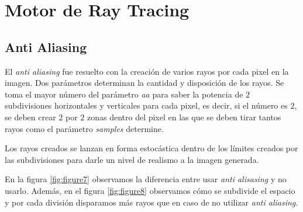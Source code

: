\documentclass[a4paper,10pt]{article}
\begin{document}
\section{Motor de Ray Tracing}
\label{motor}

\subsection{Anti Aliasing}
El \emph{anti aliasing} fue resuelto con la creaci\'on de varios rayos por cada
pixel en la imagen. Dos par\'ametros determinan la cantidad y disposici\'on de
los rayos. Se toma el mayor n\'umero del par\'ametro \emph{aa} para saber la
potencia de $2$ subdivisiones horizontales y verticales para cada pixel, es
decir, si el n\'umero es $2$, se deben crear $2$ por $2$ zonas dentro del pixel
en las que se deben tirar tantos rayos como el par\'ametro \emph{samples}
determine.

Los rayos creados se lanzan en forma estoc\'astica dentro de los l\'imites
creados por las subdivisiones para darle un nivel de realismo a la imagen
generada.

En la figura \ref{fig:figure7} observamos la diferencia entre usar
\emph{anti alisasing} y no usarlo.  Adem\'as, en el figura \ref{fig:figure8}
observamos c\'omo se subdivide el espacio y por cada divisi\'on disparamos
m\'as rayos que en caso de no utilizar \emph{anti aliasing}.
\end{document}
